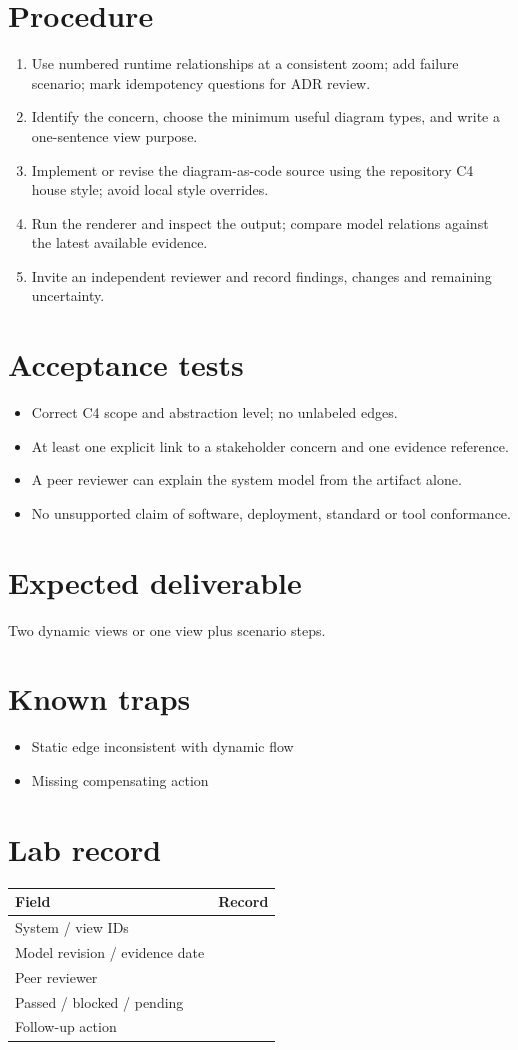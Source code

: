 \documentclass[10pt,letterpaper]{article}
\begin{document}
\section{Procedure}
\begin{enumerate}
\item Use numbered runtime relationships at a consistent zoom; add failure scenario; mark idempotency questions for ADR review.
\item Identify the concern, choose the minimum useful diagram types, and write a one-sentence view purpose.
\item Implement or revise the diagram-as-code source using the repository C4 house style; avoid local style overrides.
\item Run the renderer and inspect the output; compare model relations against the latest available evidence.
\item Invite an independent reviewer and record findings, changes and remaining uncertainty.
\end{enumerate}

\section{Acceptance tests}
\begin{itemize}
\item Correct C4 scope and abstraction level; no unlabeled edges.
\item At least one explicit link to a stakeholder concern and one evidence reference.
\item A peer reviewer can explain the system model from the artifact alone.
\item No unsupported claim of software, deployment, standard or tool conformance.
\end{itemize}

\section{Expected deliverable}
Two dynamic views or one view plus scenario steps.


\section{Known traps}
\begin{itemize}
\item Static edge inconsistent with dynamic flow
\item Missing compensating action
\end{itemize}

\section{Lab record}
\begin{tabularx}{\linewidth}{@{}YY@{}}\toprule
\textbf{Field} & \textbf{Record} \\ \midrule
System / view IDs &  \\
Model revision / evidence date &  \\
Peer reviewer &  \\
Passed / blocked / pending &  \\
Follow-up action &  \\
\bottomrule\end{tabularx}
\end{document}
